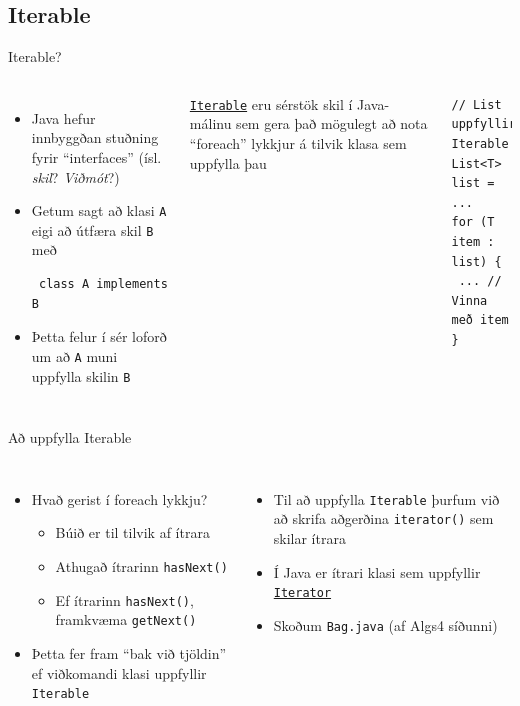 \documentclass[handout]{beamer}
\begin{document}
\subsection{Iterable}

\begin{frame}[fragile]{Iterable?}
\begin{columns}
\begin{itemize}
 \item Java hefur innbyggðan stuðning fyrir ``interfaces'' (ísl. \emph{skil}? \emph{Viðmót}?)
 \item Getum sagt að klasi \texttt{A} eigi að útfæra skil \texttt{B} með
 \begin{verbatim}
 class A implements B
 \end{verbatim}
 \item Þetta felur í sér loforð um að \texttt{A} muni uppfylla skilin \texttt{B}
\end{itemize}
\href{https://docs.oracle.com/javase/8/docs/api/java/lang/Iterable.html}{\texttt{Iterable}} eru sérstök skil í Java-málinu sem gera það mögulegt að nota ``foreach'' lykkjur á tilvik klasa sem uppfylla þau
\begin{verbatim}
// List uppfyllir Iterable
List<T> list = ... 
for (T item : list) {
 ... // Vinna með item
}
\end{verbatim}
\end{columns}
\end{frame}

\begin{frame}{Að uppfylla Iterable}
\begin{columns}
\begin{itemize}
 \item Hvað gerist í foreach lykkju?
 \begin{itemize}
  \item Búið er til tilvik af ítrara 
  \item Athugað ítrarinn \texttt{hasNext()}
  \item Ef ítrarinn \texttt{hasNext()}, framkvæma \texttt{getNext()}
 \end{itemize}
 \item Þetta fer fram ``bak við tjöldin'' ef viðkomandi klasi uppfyllir \texttt{Iterable}
\end{itemize}
\begin{itemize}
 \item Til að uppfylla \texttt{Iterable} þurfum við að skrifa aðgerðina \texttt{iterator()} sem skilar ítrara
 \item Í Java er ítrari klasi sem uppfyllir \href{https://docs.oracle.com/javase/8/docs/api/java/util/Iterator.html}{\texttt{Iterator}}
 \item Skoðum \texttt{Bag.java} (af Algs4 síðunni)
\end{itemize}
\end{columns}
\end{frame}
\end{document}
